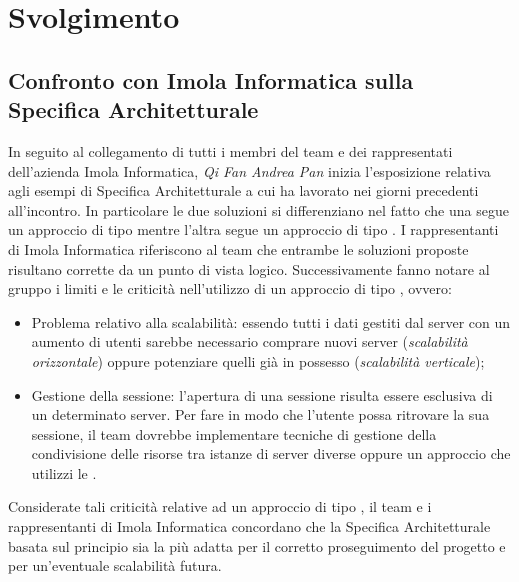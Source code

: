 \section{Svolgimento}

\subsection{Confronto con Imola Informatica sulla Specifica Architetturale} 
In seguito al collegamento di tutti i membri del team e dei rappresentati dell'azienda Imola Informatica, \textit{Qi Fan Andrea Pan} inizia l'esposizione relativa agli esempi di Specifica Architetturale a cui ha lavorato nei giorni precedenti all'incontro. In particolare le due soluzioni si differenziano nel fatto che una segue un approccio di tipo  mentre l'altra segue un approccio di tipo . \newline
I rappresentanti di Imola Informatica riferiscono al team che entrambe le soluzioni proposte risultano corrette da un punto di vista logico. Successivamente fanno notare al gruppo i limiti e le criticità nell'utilizzo di un approccio di tipo , ovvero: 
\begin{itemize}
    \item Problema relativo alla scalabilità: essendo tutti i dati gestiti dal server con un aumento di utenti sarebbe necessario comprare nuovi server (\textit{scalabilità orizzontale}) oppure potenziare quelli già in possesso (\textit{scalabilità verticale});
    \item Gestione della sessione: l'apertura di una sessione risulta essere esclusiva di un determinato server. Per fare in modo che l'utente possa ritrovare la sua sessione, il team dovrebbe implementare tecniche di gestione della condivisione delle risorse tra istanze di server diverse oppure un approccio che utilizzi le .
\end{itemize}
Considerate tali criticità relative ad un approccio di tipo , il team e i rappresentanti di Imola Informatica concordano che la Specifica Architetturale basata sul principio  sia la più adatta per il corretto proseguimento del progetto e per un'eventuale scalabilità futura. 

